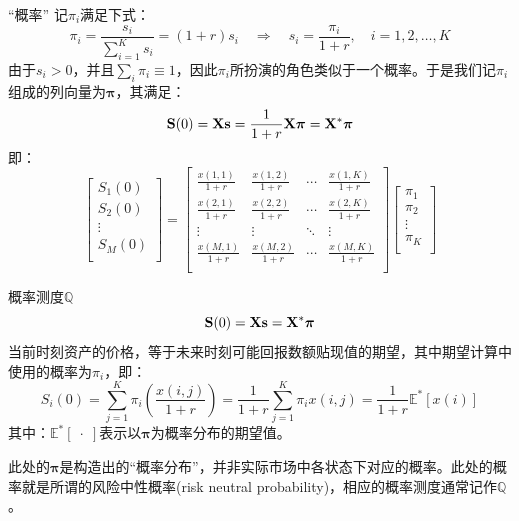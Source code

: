 \documentclass[t]{beamer}
\newcommand{\E}{\mathbb{E}}
\begin{document}
\begin{frame}{“概率”}
记$\pi_i$满足下式：
\[\pi_i=\frac{s_i}{\sum_{i=1}^K s_i}=(1+r) s_i\quad \Rightarrow\quad s_i=\frac{\pi_i}{1+r},\quad i=1,2,\ldots,K \]
由于$s_i>0$，并且$\sum_i\pi_i\equiv 1$，因此$\pi_i$所扮演的角色类似于一个概率。于是我们记$\pi_i$组成的列向量为$\bm{\pi}$，其满足：
\begin{equation*}
{\bf S}(0)={\bf X}{\bf s}=\frac{1}{1+r}{\bf X}\bm{\pi}={\bf X}^*\bm{\pi}
\end{equation*}
即：
\begin{equation*}
\begin{bmatrix}
S_1(0)\\
S_2(0)\\
\vdots\\
S_M(0)\\
\end{bmatrix}= \begin{bmatrix}
\frac{x(1,1)}{1+r} & \frac{x(1,2)}{1+r}& \cdots & \frac{x(1,K)}{1+r}\\
\frac{x(2,1)}{1+r} & \frac{x(2,2)}{1+r}& \cdots & \frac{x(2,K)}{1+r}\\
\vdots & \vdots&\ddots&\vdots\\
\frac{x(M,1)}{1+r} & \frac{x(M,2)}{1+r}& \cdots & \frac{x(M,K)}{1+r}\\
\end{bmatrix}
  \begin{bmatrix}
\pi_1\\
\pi_2\\
\vdots\\
\pi_K\\
\end{bmatrix}
\end{equation*}
\end{frame}

\begin{frame}{概率测度$\mathbb{Q}$}
\begin{equation*}
{\bf S}(0)={\bf X}{\bf s}={\bf X}^*\bm{\pi}
\end{equation*}
当前时刻资产的价格，等于未来时刻可能回报数额贴现值的期望，其中期望计算中使用的概率为$\pi_i$，即：
\begin{equation*}
S_i(0) = \sum^K_{j=1}\pi_i\left( \frac{x(i,j)}{1+r}\right) =\frac{1}{1+r}\sum^K_{j=1}\pi_ix(i,j)=\frac{1}{{1+r}}\E^*[x(i)]
\end{equation*}
其中：$\E^*[\;\cdot\;]$表示以$\bm{\pi}$为概率分布的期望值。

此处的$\bm{\pi}$是构造出的“概率分布”，并非实际市场中各状态下对应的概率。此处的概率就是所谓的风险中性概率(risk neutral probability)，相应的概率测度通常记作$\mathbb{Q}$。
\end{frame}
\end{document}
